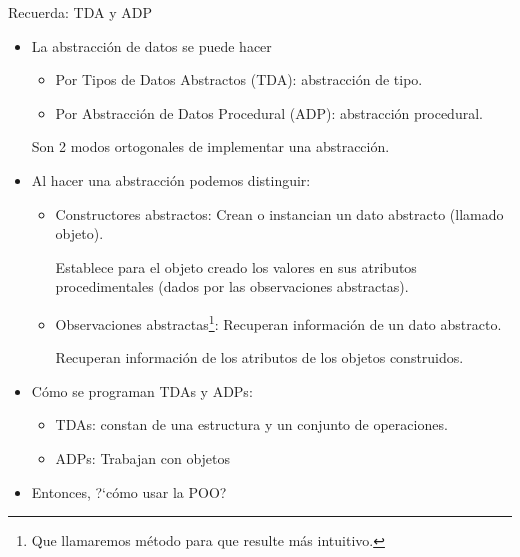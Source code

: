 \documentclass[10pt,envcountsect,spanish]{beamer}
\begin{document}
\begin{frame}{Recuerda: TDA y ADP} 

\begin{itemize} %
\item La abstracción de datos se puede hacer

\begin{itemize}\setlength{\itemsep}{0mm} 
\item Por Tipos de Datos Abstractos (TDA): abstracción de tipo.
\item Por Abstracción de Datos Procedural (ADP): abstracción procedural.
\end{itemize}

Son 2 modos ortogonales de implementar una abstracción.

\item Al hacer una abstracción podemos distinguir:

\begin{itemize}\setlength{\itemsep}{0mm}
\item Constructores abstractos: Crean o instancian un dato abstracto  (llamado objeto).

Establece para el objeto creado los valores en sus atributos procedimentales (dados por las observaciones abstractas).

\item Observaciones abstractas\footnote[frame]{Que llamaremos método para que resulte más intuitivo.}: Recuperan información de  un dato abstracto.

Recuperan información de los atributos de los objetos construidos.
\end{itemize}

\item Cómo se programan TDAs y ADPs:
\begin{itemize}
\item  TDAs: constan de una estructura y un conjunto de operaciones.


\item ADPs: Trabajan con objetos

\end{itemize}

\item Entonces, ?`cómo usar la POO?

\end{itemize}
\end{frame}
\end{document}
